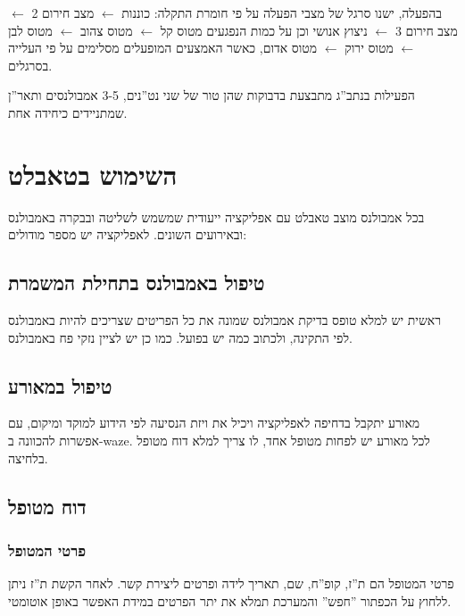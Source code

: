 \documentclass{article}
\begin{document}
בהפעלה, ישנו סרגל של מצבי הפעלה על פי חומרת התקלה: כוננות \(\leftarrow\) מצב חירום 2 \(\leftarrow\) מצב חירום 3 \(\leftarrow\) ניצוץ אנושי וכן על כמות הנפגעים מטוס קל \(\leftarrow\) מטוס צהוב \(\leftarrow\) מטוס לבן \(\leftarrow\) מטוס ירוק \(\leftarrow\) מטוס אדום, כאשר האמצעים המופעלים מסלימים על פי העלייה בסרגלים.

הפעילות בנתב''ג מתבצעת בדבוקות שהן טור של שני נט''נים, 3-5 אמבולנסים ותאר''ן שמתניידים כיחידה אחת. 
\section{השימוש בטאבלט}
בכל אמבולנס מוצב טאבלט עם אפליקציה ייעודית שמשמש לשליטה ובבקרה באמבולנס ובאירועים השונים. לאפליקציה יש מספר מודולים:
\subsection{טיפול באמבולנס בתחילת המשמרת}
ראשית יש למלא טופס בדיקת אמבולנס שמונה את כל הפריטים שצריכים להיות באמבולנס לפי התקינה, ולכתוב כמה יש בפועל. כמו כן יש לציין נזקי פח באמבולנס.

\subsection{טיפול במאורע}
מאורע יתקבל בדחיפה לאפליקציה ויכיל את ויזת הנסיעה לפי הידוע למוקד ומיקום, עם אפשרות להכוונה ב-waze. לכל מאורע יש לפחות מטופל אחד, לו צריך למלא דוח מטופל בלחיצה.

\subsection{דוח מטופל}
\subsubsection{פרטי המטופל}
פרטי המטופל הם ת''ז, קופ''ח, שם, תאריך לידה ופרטים ליצירת קשר. לאחר הקשת ת''ז ניתן ללחוץ על הכפתור ''חפש'' והמערכת תמלא את יתר הפרטים במידת האפשר באופן אוטומטי.
\end{document}
